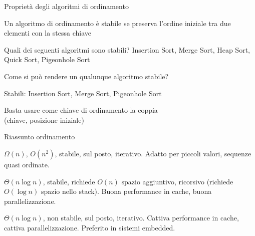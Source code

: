 \begin{frame}{Proprietà degli algoritmi di ordinamento}

\vspace{-9pt}
\begin{myboxtitle}[Stabilità]
Un algoritmo di ordinamento è \alert{stabile} se preserva l'ordine iniziale tra due elementi con la stessa chiave
\end{myboxtitle}

\begin{myboxtitle}[Domande]
\BI
\item Quali dei seguenti algoritmi sono stabili? Insertion Sort, Merge Sort, Heap Sort, Quick Sort, Pigeonhole Sort
\item Come si può rendere un qualunque algoritmo stabile?
\EI
\end{myboxtitle}

\pause
\begin{myboxtitle}[Risposte]
\BI
\item Stabili: Insertion Sort, Merge Sort, Pigeonhole Sort
\item  Basta usare come chiave di ordinamento la coppia\\ (chiave, posizione iniziale) 
\EI
\end{myboxtitle}
\end{frame}%

\begin{frame}{Riassunto ordinamento}

\vspace{-9pt}
\begin{myboxtitle}
$\Omega(n)$, $O(n^2)$, stabile, sul posto, iterativo. Adatto per piccoli valori, sequenze quasi ordinate.
\end{myboxtitle}
\begin{myboxtitle}
$\Theta(n\log n)$, stabile, richiede $O(n)$ spazio aggiuntivo, ricorsivo (richiede $O(\log n)$ spazio nello stack). Buona performance in cache, buona parallelizzazione.
\end{myboxtitle}
\begin{myboxtitle}
$\Theta(n\log n)$, non stabile, sul posto, iterativo. Cattiva performance in cache, cattiva parallelizzazione. Preferito in sistemi embedded.
\end{myboxtitle}
\end{frame}%

